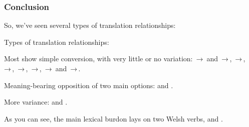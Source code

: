 \subsubsection{Conclusion}

\begin{paper}
	{\click} So, we’ve seen several types of translation relationships:
\end{paper}

\begin{hopoint}
	Types of translation relationships:
	\begin{compactitem}
		\item Most show simple conversion, with very little or no variation:
			\,→\, and \,→\,, \,→\,, \,→\,, \,→\,, \,→\,, \,→\, and \,→\,.
		\item Meaning-bearing opposition of two main options:
			 and .
		\item More variance:
			 and .
	\end{compactitem}
\end{hopoint}

\begin{paper}
	As you can see, the main lexical burdon lays on two Welsh verbs,  and .
\end{paper}
